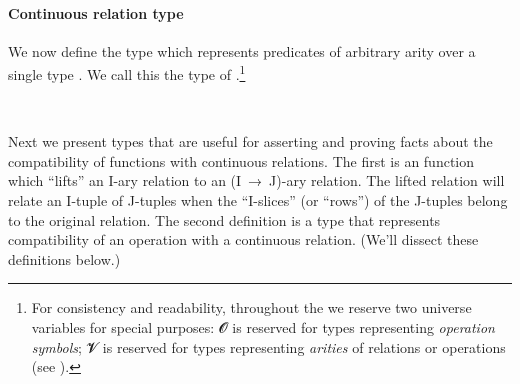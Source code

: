 \paragraph*{Continuous relation type} %

We now define the type  which represents predicates of arbitrary arity over a single type . We call this the type of .\footnote{%
For consistency and readability, throughout the \ualib we reserve two universe variables for special purposes: 𝓞 is reserved for types representing \emph{operation symbols}; 𝓥 is reserved for types representing \emph{arities} of relations or operations (see ).}
\ccpad
\begin{code}%
\>[0]\AgdaSpace{}%
\AgdaSymbol{:}\AgdaSpace{}%
\AgdaSpace{}%
\AgdaSpace{}%
\AgdaSpace{}%
\AgdaSpace{}%
\AgdaSpace{}%
\AgdaSpace{}%
\AgdaSymbol{(}\AgdaSpace{}%
\AgdaSymbol{:}\AgdaSpace{}%
\AgdaSymbol{)}\AgdaSpace{}%
\AgdaSpace{}%
\AgdaSpace{}%
\AgdaSpace{}%
\AgdaSpace{}%
\AgdaSpace{}%
\AgdaSpace{}%
\AgdaSpace{}%
\<%
\\
\>[0]\AgdaSpace{}%
\AgdaSpace{}%
\AgdaSpace{}%
\AgdaSpace{}%
\AgdaSymbol{=}\AgdaSpace{}%
\AgdaSymbol{(}\AgdaSpace{}%
\AgdaSpace{}%
\AgdaSymbol{)}\AgdaSpace{}%
\AgdaSpace{}%
\AgdaSpace{}%
\<%
\end{code}
\ccpad
Next we present types that are useful for asserting and proving facts about the compatibility of functions with continuous relations. The first is an  function which ``lifts'' an \ab I-ary relation to an (\ab I~\as →~\ab J)-ary relation. The lifted relation will relate an \ab I-tuple of \ab J-tuples when the ``\ab I-slices'' (or ``rows'') of the \ab J-tuples belong to the original relation. The second definition is a type that represents compatibility of an operation with a continuous relation. (We'll dissect these definitions below.)
